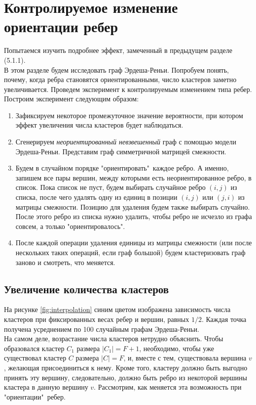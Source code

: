 \newpage
\section{Контролируемое изменение ориентации ребер}
Попытаемся изучить подробнее эффект, замеченный в предыдущем разделе (5.1.1).\\

В этом разделе будем исследовать граф Эрдеша-Реньи. Попробуем понять, почему, когда ребра становятся ориентированными, число кластеров заметно увеличивается. Проведем эксперимент к контролируемым изменением типа ребер. Построим эксперимент следующим образом:

\begin{enumerate}
	\item Зафиксируем некоторое промежуточное значение вероятности, при котором эффект увеличения числа кластеров будет наблюдаться. 
	
	\item Сгенерируем \textit{неориентированный невзвешенный} граф с помощью модели Эрдеша-Реньи. Представим граф симметричной матрицей смежности.
	
	\item Будем в случайном порядке "ориентировать"\ каждое ребро. А именно, запишем все пары вершин, между которыми есть неориентированное ребро, в список. Пока список не пуст, будем выбирать случайное ребро $(i, j)$ из списка, после чего удалять одну из единиц в позиции $(i,j)$ или $(j,i)$ из матрицы смежности. Позицию для удаления будем также выбирать случайно. После этого ребро из списка нужно удалить, чтобы ребро не исчезло из графа совсем, а только "ориентировалось".
	
	\item После каждой операции удаления единицы из матрицы смежности (или после нескольких таких операций, если граф большой) будем кластеризовать граф заново и смотреть, что меняется.
	
\end{enumerate}

\subsection{Увеличение количества кластеров}
На рисунке \ref{fig:interpolation} синим цветом изображена зависимость числа кластеров при фиксированных весах ребер и вершин, равных $1/2$. Каждая точка получена усреднением по 100 случайным графам Эрдеша-Реньи.\\

На самом деле, возрастание числа кластеров нетрудно объяснить. Чтобы образовался кластер $C_1$ размера $|C_1|=F+1$, необходимо, чтобы уже существовал кластер $C$ размера $|C|=F$, и, вместе с тем, существовала вершина $v$, желающая присоединиться к нему. Кроме того, кластеру должно быть выгодно принять эту вершину, следовательно, должно быть ребро из некоторой вершины кластера в данную вершину $v$. Рассмотрим, как меняется эта возможность при "ориентации"\ ребер. \\

